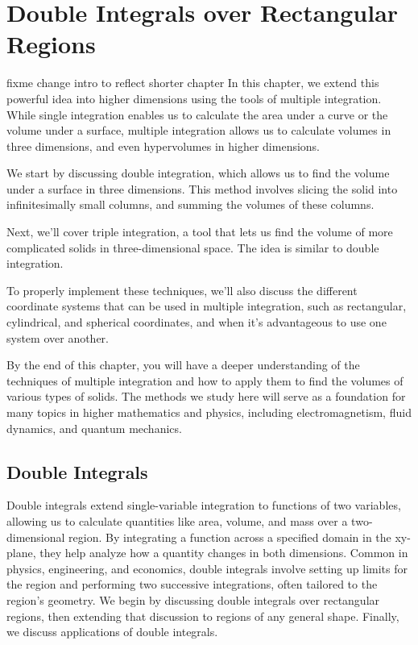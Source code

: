 \chapter{Double Integrals over Rectangular Regions}

fixme change intro to reflect shorter chapter
In this chapter, we extend this powerful idea into higher dimensions using the 
tools of multiple integration. While single integration enables us to calculate
the area under a curve or the volume under a surface, multiple integration 
allows us to calculate volumes in three dimensions, and even hypervolumes in 
higher dimensions.

We start by discussing double integration, which allows us to find the volume 
under a surface in three dimensions. This method involves slicing the solid 
into infinitesimally small columns, and summing the volumes of these columns.

Next, we'll cover triple integration, a tool that lets us find the volume of 
more complicated solids in three-dimensional space. The idea is similar to 
double integration.

To properly implement these techniques, we'll also discuss the different 
coordinate systems that can be used in multiple integration, such as 
rectangular, cylindrical, and spherical coordinates, and when it's advantageous
to use one system over another.

By the end of this chapter, you will have a deeper understanding of the 
techniques of multiple integration and how to apply them to find the volumes 
of various types of solids. The methods we study here will serve as a 
foundation for many topics in higher mathematics and physics, including 
electromagnetism, fluid dynamics, and quantum mechanics.

\section{Double Integrals}
Double integrals extend single-variable integration to functions of two 
variables, allowing us to calculate quantities like area, volume, and mass 
over a two-dimensional region. By integrating a function across a specified 
domain in the xy-plane, they help analyze how a quantity changes in both 
dimensions. Common in physics, engineering, and economics, double integrals 
involve setting up limits for the region and performing two successive 
integrations, often tailored to the region's geometry. We begin by discussing 
double integrals over rectangular regions, then extending that discussion to 
regions of any general shape. Finally, we discuss applications of double 
integrals. 

